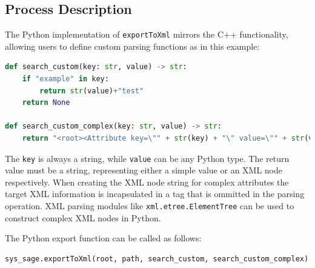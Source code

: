 \subsection{Process Description}

The Python implementation of \verb|exportToXml| mirrors the C++ functionality, allowing users to define custom parsing functions as in this example:

\begin{lstlisting}[language=Python, xleftmargin=4em, frame = single]
def search_custom(key: str, value) -> str:
    if "example" in key:
        return str(value)+"test"
    return None

def search_custom_complex(key: str, value) -> str:
    return "<root><Attribute key=\"" + str(key) + "\" value=\"" + str(value) + "\"/><root>"
\end{lstlisting}

The \verb|key| is always a string, while \verb|value| can be any Python type. The return value must be a string, representing either a simple value or an XML node respectively. When creating the XML node string for complex attributes the target XML information is incapsulated in a tag that is ommitted in the parsing operation. XML parsing modules like \verb|xml.etree.ElementTree| \cite{xml-etree} can be used to construct complex XML nodes in Python.

The Python export function can be called as follows:

\begin{lstlisting}[language=Python, xleftmargin=4em, frame = single]
sys_sage.exportToXml(root, path, search_custom, search_custom_complex)
\end{lstlisting}



